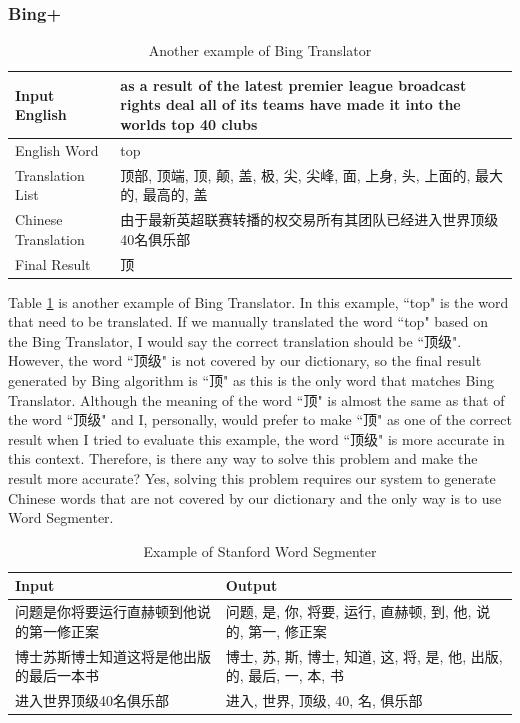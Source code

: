 \subsubsection{Bing+}
\begin{table}[ht]
    \caption{Another example of Bing Translator}
    \label{table:bing_plus_1}
    \begin{center}
    \begin{tabular}{| p{2.5cm} | p{4cm} |}
        \hline
        Input English & as a result of the latest premier league broadcast rights deal all of its teams have made it into the worlds top 40 clubs\\
        \hline
        English Word & top \\
        \hline
        Translation List & \parbox[t]{4cm}{顶部, 顶端, 顶, 颠, 盖, 极, 尖, 尖峰, 面, 上身, 头, 上面的, 最大的, 最高的, 盖}\\
        \hline
        Chinese Translation & 由于最新英超联赛转播的权交易所有其团队已经进入世界顶级40名俱乐部\\
        \hline
        Final Result & 顶\\
        \hline
    \end{tabular}
    \end{center}
\end{table}
Table \ref{table:bing_plus_1} is another example of Bing Translator. In this example, ``top" is the word that need to be translated. If we manually translated the word ``top" based on the Bing Translator, I would say the correct translation should be ``顶级". However, the word ``顶级" is not covered by our dictionary, so the final result generated by Bing algorithm is ``顶" as this is the only word that matches Bing Translator. Although the meaning of the word ``顶" is almost the same as that of the word ``顶级" and I, personally, would prefer to make ``顶" as one of the correct result when I tried to evaluate this example, the word ``顶级" is more accurate in this context. Therefore, is there any way to solve this problem and make the result more accurate? Yes, solving this problem requires our system to generate Chinese words that are not covered by our dictionary and the only way is to use Word Segmenter.
\\
\begin{table}[ht]
    \caption{Example of Stanford Word Segmenter}
    \label{table:bing_plus_2}
    \begin{tabular}{| p{3.5cm} | p{3.5cm} |}
        \hline
        Input & Output\\
        \hline
        问题是你将要运行直赫顿到他说的第一修正案 & 问题, 是, 你, 将要, 运行, 直赫顿, 到, 他, 说的, 第一, 修正案\\
        \hline
        博士苏斯博士知道这将是他出版的最后一本书 & 博士, 苏, 斯, 博士, 知道, 这, 将, 是, 他, 出版, 的, 最后, 一, 本, 书\\
        \hline
        进入世界顶级40名俱乐部 & 进入, 世界, 顶级, 40, 名, 俱乐部\\
        \hline
    \end{tabular}
\end{table}
